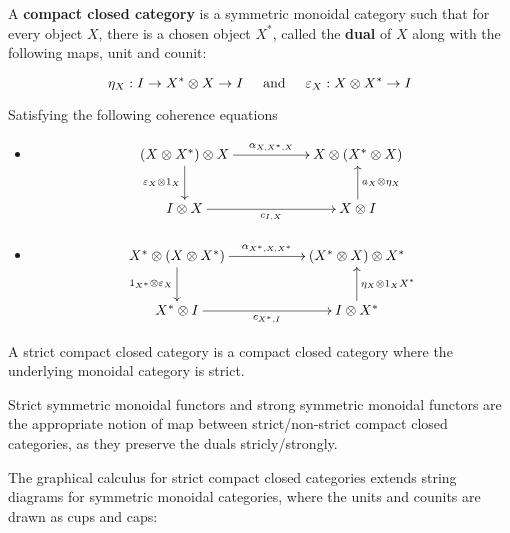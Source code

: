 \begin{definition}
A {\bf compact closed category} is a symmetric monoidal category such that for every object $X$, there is a chosen object $X^*$, called the {\bf dual} of $X$ along with the following maps, unit and counit:

$$
\eta_X:I\to X^* \otimes X\to I \hspace*{.5cm}\text{and}\hspace*{.5cm} \epsilon_X:X\otimes X^*\to I
$$

Satisfying the following coherence equations

\begin{itemize}
\item
$$
\xymatrix{
  (X\otimes X^*)\otimes X \ar[rr]^{\alpha_{X,X^*,X}}  \ar[d]_{\epsilon_X\otimes 1_X}
    & 
    & X\otimes(X^*\otimes X)
  \\I\otimes X \ar[rr]_{c_{I,X}}
    &
    & X\otimes I \ar[u]_{a_X\otimes \eta_X}
}
$$

\item

$$
\xymatrix{
  X^*\otimes ( X\otimes X^*) \ar[rr]^{\alpha_{X^*,X,X^*}}  \ar[d]_{1_{X^*}\otimes \epsilon_X}
    & 
    & (X^* \otimes X)\otimes X^*
  \\X^*\otimes I \ar[rr]_{c_{X^*,I}}
    &
    & I\otimes X^* \ar[u]_{\eta_X\otimes 1_X{X^*}}
}
$$
\end{itemize}


A strict compact closed category is a compact closed category where the underlying monoidal category is strict.

Strict symmetric monoidal functors and strong symmetric monoidal functors are the appropriate notion of map between strict/non-strict compact closed categories, as they preserve the duals stricly/strongly.
\end{definition}

The graphical calculus for strict compact closed categories extends string diagrams for symmetric monoidal categories, where  the units and counits are drawn as cups and caps:

